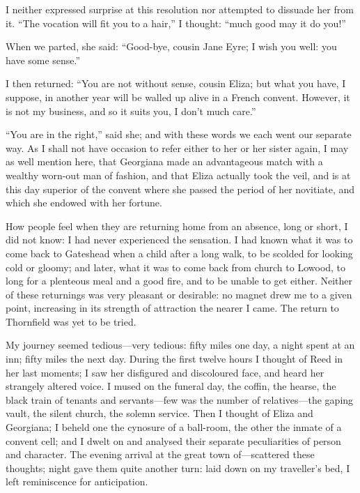 I neither expressed surprise at this resolution nor attempted to
dissuade her from it. \enquote{The vocation will fit you to a hair,} I
thought: \enquote{much good may it do you!}

When we parted, she said: \enquote{Good-bye, cousin Jane Eyre; I wish
you well: you have some sense.}

I then returned: \enquote{You are not without sense, cousin Eliza; but
what you have, I suppose, in another year will be walled up alive in a
French convent. However, it is not my business, and so it suits you, I
don't much care.}

\enquote{You are in the right,} said she; and with these words we each
went our separate way. As I shall not have occasion to refer either to
her or her sister again, I may as well mention here, that Georgiana made
an advantageous match with a wealthy worn-out man of fashion, and that
Eliza actually took the veil, and is at this day superior of the convent
where she passed the period of her novitiate, and which she endowed with
her fortune.

How people feel when they are returning home from an absence, long or
short, I did not know: I had never experienced the sensation. I had
known what it was to come back to Gateshead when a child after a long
walk, to be scolded for looking cold or gloomy; and later, what it was
to come back from church to Lowood, to long for a plenteous meal and a
good fire, and to be unable to get either. Neither of these returnings
was very pleasant or desirable: no magnet drew me to a given point,
increasing in its strength of attraction the nearer I came. The return
to Thornfield was yet to be tried.

My journey seemed tedious---very tedious: fifty miles one day, a night
spent at an inn; fifty miles the next day. During the first twelve
hours I thought of \Mrs{} Reed in her last moments; I saw her disfigured
and discoloured face, and heard her strangely altered voice. I mused on
the funeral day, the coffin, the hearse, the black train of tenants and
servants---few was the number of relatives---the gaping vault, the
silent church, the solemn service. Then I thought of Eliza and
Georgiana; I beheld one the cynosure of a ball-room, the other the
inmate of a convent cell; and I dwelt on and analysed their separate
peculiarities of person and character. The evening arrival at the great
town of---scattered these thoughts; night gave them quite another turn:
laid down on my traveller's bed, I left reminiscence for anticipation.

